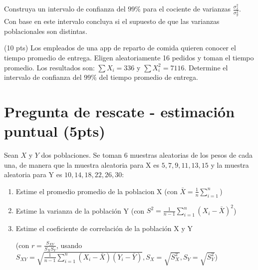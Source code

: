 \documentclass[addpoints]{exam}
\theoremstyle{mytheor}
\begin{document}
\begin{questions}
Construya un intervalo de confianza del $99\%$ para el cociente de varianzas $\frac{\sigma_x^2}{\sigma_y^2}$. Con base en este intervalo concluya si el supuesto de que las varianzas poblacionales son distintas.

 \question (10 pts) Los empleados de una app de reparto de comida quieren conocer el tiempo promedio de entrega. Eligen aleatoriamente 16 pedidos y toman el tiempo promedio. Los resultados son: $\sum X_i = 336$ y $\sum X_i^2 = 7116$. Determine el intervalo de confianza del $99\%$ del tiempo promedio de entrega.
  
  
  \section*{Pregunta de rescate - estimación puntual (5pts)}
   \question Sean $X$ y $Y$ dos poblaciones. Se toman 6 muestras aleatorias de los pesos de cada una, de manera que la muestra aleatoria para X es ${5,7,9,11,13,15}$ y la muestra aleatoria para Y es ${10,14,18,22,26,30}$:
  
  \begin{enumerate}
  \item Estime el promedio promedio de la poblacion X (con $\bar{X} = \frac{1}{n}\sum_{i=1}^n$)
  \item Estime la varianza de la población Y (con $S^2 = \frac{1}{n-1}\sum_{i=1}^n (X_i - \bar{X})^2$)
  \item Estime el coeficiente de correlación de la población X y Y 
  
  (con $r = \frac{S_{XY}}{S_X S_Y}$, usando $S_{XY} =\sqrt{\frac{1}{n-1}\sum_{i=1}^n (X_i - \bar{X})(Y_i-\bar{Y})}, S_X = \sqrt{S_X^2}, S_Y = \sqrt{S_Y^2}$)
  \end{enumerate}

  \end{questions}
  
\end{document}
